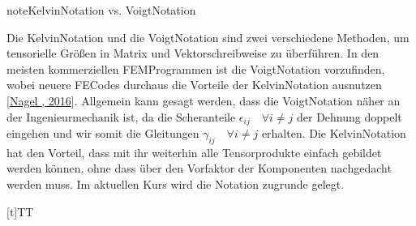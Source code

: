 \documentclass[letterpaper,10pt,german]{jupyterBook}
\begin{document}
\begin{sphinxadmonition}{note}{Kelvin\sphinxhyphen{}Notation vs. Voigt\sphinxhyphen{}Notation}

\sphinxAtStartPar
Die Kelvin\sphinxhyphen{}Notation und die Voigt\sphinxhyphen{}Notation sind zwei verschiedene Methoden, um tensorielle Größen in Matrix\sphinxhyphen{} und Vektorschreibweise zu überführen. In den meisten kommerziellen FEM\sphinxhyphen{}Programmen ist die Voigt\sphinxhyphen{}Notation vorzufinden, wobei neuere FE\sphinxhyphen{}Codes durchaus die Vorteile der Kelvin\sphinxhyphen{}Notation ausnutzen {[}\hyperlink{cite.quellen:id8}{Nagel , 2016}{]}. Allgemein kann gesagt werden, dass die Voigt\sphinxhyphen{}Notation näher an der Ingenieurmechanik ist, da die Scheranteile \(\epsilon_{ij} \quad \forall i\neq j\) der Dehnung doppelt eingehen und wir somit die Gleitungen \(\gamma_{ij} \quad \forall i\neq j\) erhalten. Die Kelvin\sphinxhyphen{}Notation hat den Vorteil, dass mit ihr weiterhin alle Tensorprodukte einfach gebildet werden können, ohne dass über den Vorfaktor der Komponenten nachgedacht werden muss. Im aktuellen Kurs wird die \sphinxhyphen{}Notation zugrunde gelegt.


\begin{savenotes}\sphinxattablestart
\sphinxthistablewithglobalstyle
\centering
\begin{tabulary}{\linewidth}[t]{TT}
\sphinxtoprule

\sphinxAtStartPar


\end{tabulary}
\end{savenotes}
\end{sphinxadmonition}
\end{document}
